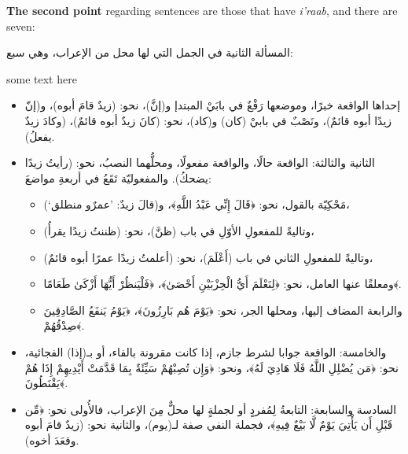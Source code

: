 \documentclass[../main.tex]{subfiles}
\begin{document}
\begin{english}
\end{english}

\begin{paracol}{2}

\begin{english}
    \textbf{The second point} regarding sentences are those that have \textit{i'raab}, and there are seven:
\end{english}

\switchcolumn
المسألة الثانية في الجمل التي لها محل من الإعراب، وهي سبع:

\switchcolumn

\begin{english}
    some text here
\end{english}

\switchcolumn*

\begin{itemize}
    \item إحداها الواقعة خبرًا، وموضعها رَفْعٌ في بابَيْ المبتدإ و(إنَّ)، نحو: (زيدٌ قامَ أبوه)، و(إنّ زيدًا أبوه قائمٌ)، ونَصْبٌ في بابيْ (كان) و(كاد)، نحو: (كانَ زيدٌ أبوه قائمٌ)، (وكادَ زيدٌ يفعلُ).
    \item الثانية والثالثة: الواقعة حالًا، والواقعة مفعولًا، ومحلُّهما النصبُ، نحو: (رأيتُ زيدًا يضحكُ).
    والمفعوليّة تَقَعُ في أربعةِ مواضعَ:
    \begin{itemize}
        \item مَحْكِيّة بالقول، نحو: ﴿قَالَ إِنِّي عَبْدُ اللَّهِ﴾، و(قالَ زيدٌ: ’عمرٌو منطلق‘)،
        \item وتاليةً للمفعولِ الأوّلِ في باب (ظنَّ)، نحو: (ظننتُ زيدًا يقرأُ)،
        \item وتاليةً للمفعولِ الثاني في باب (أَعْلَمَ)، نحو: (أعلمتُ زيدًا عمرًا أبوه قائمٌ)،
        \item ومعلقًا عنها العامل، نحو: ﴿لِنَعْلَمَ أَيُّ الْحِزْبَيْنِ أَحْصَىٰ﴾، ﴿فَلْيَنظُرْ أَيُّهَا أَزْكَىٰ طَعَامًا﴾.
        \item والرابعة المضاف إليها، ومحلها الجر، نحو: ﴿يَوْمَ هُم بَارِزُونَ﴾، ﴿يَوْمُ يَنفَعُ الصَّادِقِينَ صِدْقُهُمْ﴾.
    \end{itemize}
    \item والخامسة: الواقعة جوابا لشرط جازم، إذا كانت مقرونة بالفاء، أو بـ(إذا) الفجائية، نحو: ﴿مَن يُضْلِلِ اللَّهُ فَلَا هَادِيَ لَهُ﴾، ونحو: ﴿وَإِن تُصِبْهُمْ سَيِّئَةٌ بِمَا قَدَّمَتْ أَيْدِيهِمْ إِذَا هُمْ يَقْنَطُونَ﴾.
    \item السادسة والسابعة: التابعةُ لِمُفردٍ أو لجملةٍ لها محلٌّ مِنَ الإعراب، فالأُولى نحو: ﴿مِّن قَبْلِ أَن يَأْتِيَ يَوْمٌ لَّا بَيْعٌ فِيهِ﴾، فجملة النفي صفة لـ(يوم)، والثانية نحو: (زيدٌ قامَ أبوه وقعَدَ أخوه).
\end{itemize}

\end{paracol}
\end{document}
